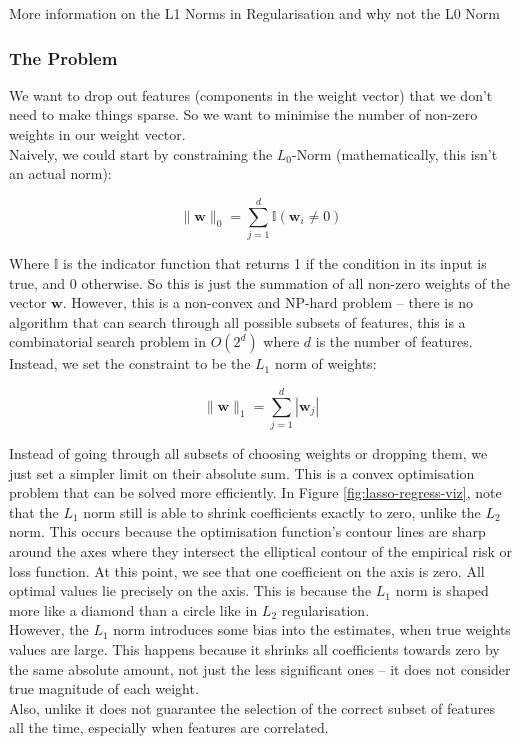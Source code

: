 \begin{sidenotebox}{More information on the L1 Norms in Regularisation and why not the L0 Norm \\ }
\subsubsection*{The Problem}
We want to drop out features (components in the weight vector) that we don't need to make things sparse. So we want to minimise the number of non-zero weights in our weight vector.\\

Naively, we could start by constraining the $L_0$-Norm (mathematically, this isn't an actual norm):

\begin{equation*}
\|\mathbf{w}\|_0=\sum_{j=1}^d\mathbb{I}\left(\mathbf{w}_i\neq0\right)
\end{equation*}

Where $\mathbb{I}$ is the indicator function that returns 1 if the condition in its input is true, and 0 otherwise. So this is just the summation of all non-zero weights of the vector $\mathbf{w}$. However, this is a non-convex and NP-hard problem – there is no algorithm that can search through all possible subsets of features, this is a combinatorial search problem in $O(2^d)$ where $d$ is the number of features.\\

Instead, we set the constraint to be the $L_1$ norm of weights:

\[\|\mathbf{w}\|_1=\sum_{j=1}^d|\mathbf{w}_j|\]


Instead of going through all subsets of choosing weights or dropping them, we just set a  simpler limit on their absolute sum. This is a convex optimisation problem that can be solved more efficiently. In Figure \ref{fig:lasso-regress-viz}, note that the $L_1$ norm still is able to shrink coefficients exactly to zero, unlike the $L_2$ norm. This occurs because the optimisation function's contour lines are sharp around the axes where they intersect the elliptical contour of the empirical risk or loss function. At this point, we see that one coefficient on the axis is zero. All optimal values lie precisely on the axis. This is because the $L_1$ norm is shaped more like a diamond than a circle like in $L_2$ regularisation.\\

    However, the $L_1$ norm introduces some bias into the estimates, when true weights values are large. This happens because it shrinks all coefficients towards zero by the same absolute amount, not just the less significant ones – it does not consider true magnitude of each weight.\\
    
    Also, unlike it does not guarantee the selection of the correct subset of features all the time, especially when features are correlated.
\end{sidenotebox}

